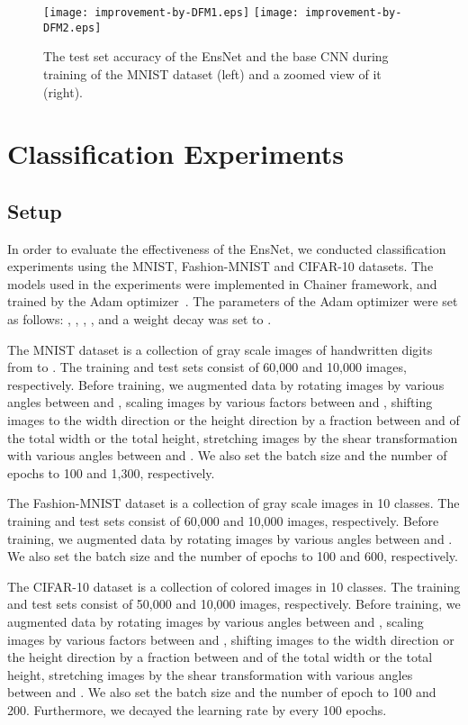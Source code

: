 \documentclass[a4j]{article}
\begin{document}
\begin{figure}[htp]
  \texttt{[image: improvement-by-DFM1.eps]}
  \texttt{[image: improvement-by-DFM2.eps]}
  \caption{The test set accuracy of the EnsNet and the base CNN during training of the MNIST dataset (left) and a zoomed view of it (right). }
  \label{fig:improvement-by-DFM}
\end{figure}


\section{Classification Experiments}
\label{sect:3}
\subsection{Setup}
In order to evaluate the effectiveness of the EnsNet, we conducted classification experiments using the MNIST, Fashion-MNIST and CIFAR-10 datasets. The models used in the experiments were implemented in Chainer framework\cite{chainer}, and trained by the Adam optimizer~\cite{Adam}. The parameters of the Adam optimizer were set as follows: , , , , and a weight decay was set to .

The MNIST dataset is a collection of  gray scale images of handwritten digits from  to . The training and test sets consist of 60,000 and 10,000 images, respectively. Before training, we augmented data by rotating images by various angles between  and , scaling images by various factors between  and , shifting images to the width direction or the height direction by a fraction between  and  of the total width or the total height, stretching images by the shear transformation with various angles between  and . We also set the batch size and the number of epochs to 100 and 1,300, respectively. 

The Fashion-MNIST dataset is a collection of  gray scale images in 10 classes. 
The training and test sets consist of 60,000 and 10,000 images, respectively. Before training, we augmented data by rotating images by various angles between  and . We also set the batch size and the number of epochs to 100 and 600, respectively. 

The CIFAR-10 dataset is a collection of  colored images in 10 classes. The training and test sets consist of 50,000 and 10,000 images, respectively. Before training, we augmented data by rotating images by various angles between  and , scaling images by various factors between  and , shifting images to the width direction or the height direction by a fraction between  and  of the total width or the total height, stretching images by the shear transformation with various angles between  and . We also set the batch size and the number of epoch to 100 and 200. Furthermore, we decayed the learning rate  by  every 100 epochs.
\end{document}
